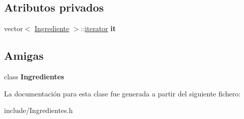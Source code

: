 \subsection*{Atributos privados}
\begin{DoxyCompactItemize}
\item 
\mbox{\label{classIngredientes_1_1iterator_aee7b139c3e51613587b38e47f67a1f38}} 
vector$<$ \hyperlink{classIngrediente}{Ingrediente} $>$\+::\hyperlink{classIngredientes_1_1iterator}{iterator} {\bfseries it}
\end{DoxyCompactItemize}
\subsection*{Amigas}
\begin{DoxyCompactItemize}
\item 
\mbox{\label{classIngredientes_1_1iterator_a1a8c7f96971fda9a9b26b6d2a72e548b}} 
class {\bfseries Ingredientes}
\end{DoxyCompactItemize}


La documentación para esta clase fue generada a partir del siguiente fichero\+:\begin{DoxyCompactItemize}
\item 
include/Ingredientes.\+h\end{DoxyCompactItemize}
